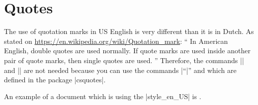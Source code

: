 \begin{otherlanguage}{USenglish}
\section{Quotes}
\label{sec:quotes}
The use of quotation marks in US English is very different than it is in Dutch.
As stated on \url{https://en.wikipedia.org/wiki/Quotation_mark}:
\enquote{%
    In American English, double quotes are used normally.
    If quote marks are used inside another pair of quote marks, then single quotes are used.%
}
Therefore, the commands |\squote| and |\dquote| are not needed because you can use the commands |\enquote| and \lcode[alsoletter=*,moretexcs=enquote*]{\\enquote*} which are defined in the package |csquotes|.

An example of a document which is using the |style_en_US| is   \cite{tds02}.
\end{otherlanguage}

